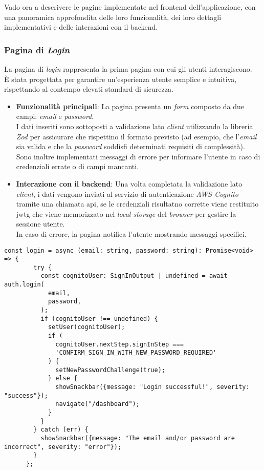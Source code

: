 \pagebreak

\noindent Vado ora a descrivere le pagine implementate nel \gls{frontend} dell'applicazione, con una panoramica approfondita delle loro funzionalità, dei loro dettagli implementativi e delle interazioni con il \gls{backend}.

\subsubsection{Pagina di \textit{Login}}
La pagina di \textit{login} rappresenta la prima pagina con cui gli utenti interagiscono.\\
È stata progettata per garantire un'esperienza utente semplice e intuitiva, rispettando al contempo elevati standard di sicurezza.
\begin{itemize}
    \item \textbf{Funzionalità principali}: La pagina presenta un \textit{form} composto da due campi: \textit{email} e \textit{password}.\\
    I dati inseriti sono sottoposti a validazione lato \textit{client} utilizzando la libreria \textit{Zod} per assicurare che rispettino il formato previsto (ad esempio, che l'\textit{email} sia valida e che la \textit{password} soddisfi determinati requisiti di complessità). \\
    Sono inoltre implementati messaggi di errore per informare l'utente in caso di credenziali errate o di campi mancanti.
    \item \textbf{Interazione con il \gls{backend}}: Una volta completata la validazione lato \textit{client}, i dati vengono inviati al servizio di autenticazione \textit{AWS Cognito} tramite una chiamata \gls{api}, se le credenziali risultatno corrette viene restituito \gls{jwtg} che viene memorizzato nel \textit{local storage} del \textit{browser} per gestire la sessione utente. \\
    In caso di errore, la pagina notifica l'utente mostrando messaggi specifici.
\end{itemize}

\begin{lstlisting}[caption={Funzione di \textit{login} nel \gls{frontend}}]
    const login = async (email: string, password: string): Promise<void> => {
        try {
          const cognitoUser: SignInOutput | undefined = await auth.login(
            email,
            password,
          );
          if (cognitoUser !== undefined) {
            setUser(cognitoUser);
            if (
              cognitoUser.nextStep.signInStep ===
              'CONFIRM_SIGN_IN_WITH_NEW_PASSWORD_REQUIRED'
            ) {
              setNewPasswordChallenge(true);
            } else {
              showSnackbar({message: "Login successful!", severity: "success"});
              navigate("/dashboard");
            }
          }
        } catch (err) {
          showSnackbar({message: "The email and/or password are incorrect", severity: "error"});
        }
      };
    \end{lstlisting}

